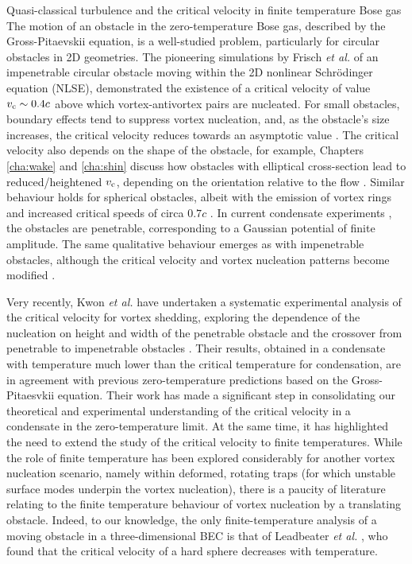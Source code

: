 \begin{chapter}{\label{cha:nonequib}Quasi-classical turbulence and the critical velocity in finite temperature Bose gas}
The motion of an obstacle in the zero-temperature Bose gas, described by the Gross-Pitaevskii equation, is a well-studied problem, particularly for circular obstacles in 2D geometries.  The pioneering simulations by Frisch {\it et al.} \cite{frisch92} of an impenetrable circular obstacle moving within the 2D nonlinear Schr\"odinger equation (NLSE), demonstrated the existence of a critical velocity of value
$v_{\rm c}\sim 0.4c$ above which vortex-antivortex pairs are nucleated.
For small obstacles, boundary effects tend to suppress vortex nucleation,
and, as the obstacle's size increases, the critical velocity reduces towards an asymptotic value \cite{berloff2000,rica2001,pham2004}.  The critical velocity also depends on the shape of the obstacle, for example, Chapters \ref{cha:wake} and \ref{cha:shin} discuss how obstacles with elliptical cross-section lead to reduced/heightened $v_{\rm c}$, depending on the orientation relative to the flow \cite{stagg_parker_14, stagg_2015b}. Similar behaviour holds for spherical obstacles, albeit with the emission of vortex rings and increased critical speeds of circa $0.7 c$ \cite{winiecki_2000,win01,stagg_parker_14}.
In current condensate experiments \cite{Neely,kwon_moon_14,Raman,Onofrio,Inouye,desbuquois_2012, kwon_2015a,kwon_2015b}, the obstacles are penetrable, corresponding to a Gaussian potential of finite amplitude. The same qualitative behaviour emerges as with impenetrable obstacles,
although the critical velocity and vortex nucleation patterns become modified \cite{saito10}.

Very recently, Kwon {\it et al.} have undertaken
a systematic experimental analysis of the critical velocity for vortex
shedding, exploring the dependence of the nucleation
on height and width of the penetrable obstacle and the crossover
from penetrable to impenetrable obstacles \cite{kwon_2015a}.
Their results, obtained in a condensate with temperature much lower than
the critical temperature for condensation, are
in agreement with previous zero-temperature predictions based on the
Gross-Pitaesvkii equation.
Their work has made a significant step in consolidating our
theoretical and experimental understanding of the critical velocity
in a condensate in the zero-temperature limit.  At the same time,
it has highlighted the need to extend the study
of the critical velocity to finite temperatures.
While the role of finite temperature has been explored considerably for another vortex nucleation scenario, namely within deformed, rotating traps \cite{hodby_2002,abo_shaeer_2002,williams_2002,penckwitt_2002,kasamatsu_2003,lobo_2004} (for which unstable surface modes underpin the vortex nucleation), there is a paucity of literature relating to the finite temperature behaviour of vortex nucleation by a translating obstacle.  Indeed, to our knowledge, the only finite-temperature analysis of a moving obstacle in a three-dimensional BEC is that of Leadbeater {\it et al.}
\cite{leadbeater_2003}, who found that the critical velocity of a hard sphere decreases with temperature.


\end{chapter}
